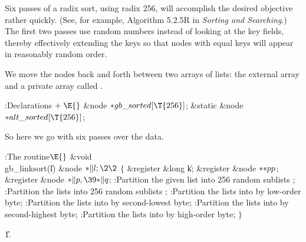 Six passes of a radix sort, using radix 256, will accomplish the desired
objective rather quickly. (See, for example, Algorithm 5.2.5R in
{\sl Sorting and Searching}.) The first two passes use random numbers instead
of looking at the key fields, thereby effectively extending the keys
so that nodes with equal keys will appear in reasonably random order.

We move the nodes back and forth between two arrays of lists: the external
array  and a private array called .

\Y\B\4:Declarations\X${}\mathrel+\E{}$\6
\&{node} ${}{*}\\{gb\_sorted}[\T{256}]{}$;\6
\&{static} \&{node} ${}{*}\\{alt\_sorted}[\T{256}]{}$;\par
\fi

So here we go with six passes over the data.

\Y\B\4:The  routine\X${}\E{}$\6
\1\1\&{void} \\{gb\_linksort}(\|l)\6
\&{node} ${}{*}\|l;\2\2{}$\6
${}\{{}$\5
\1\&{register} \&{long} \|k;\6
\&{register} \&{node} ${}{*}{*}\\{pp}{}$;\6
\&{register} \&{node} ${}{*}\|p,\39{*}\|q{}$;\7
:Partition the given list into 256 random sublists \X;\6
:Partition the  lists into 256 random sublists \X;\6
:Partition the  lists into  by
low-order byte\X;\6
:Partition the  lists into  by
second-lowest byte\X;\6
:Partition the  lists into  by
second-highest byte\X;\6
:Partition the  lists into  by
high-order byte\X;\6
\4${}\}{}$\2\par
\U1.\fi

